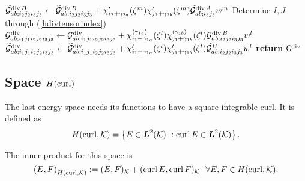 \begin{algorithm}[ht!]
\begin{algorithmic}
                                    \State$\widetilde{\mathcal{G}}_{ab;i_2j_2i_3j_3}^{\operatorname{div} B}\gets \widetilde{\mathcal{G}}_{ab;i_2j_2i_3j_3}^{\operatorname{div} B} + \chi_{i_2+\gamma_{2a}}'(\zeta^m) \chi_{j_2+\gamma_{2b}}'(\zeta^m) \widetilde{\mathcal{G}}_{ab;i_3j_3}^{\operatorname{div} A} w^m$
                                \EndIf
                        \EndFor       
                \EndFor
            \EndFor            
                            \State Determine $I,J$ through (\ref{hdivtensorindex})
                                            \State$\mathcal{G}_{ab;i_1j_1i_2j_2i_3j_3}^{\operatorname{div}}\gets \mathcal{G}_{ab;i_1j_1i_2j_2i_3j_3}^{\operatorname{div}} + \chi_{i_1+\gamma_{1a}}^{\langle\gamma_{1a}\rangle}(\zeta^l) \chi_{j_1+\gamma_{1b}}^{\langle\gamma_{1b}\rangle}(\zeta^l) \mathcal{G}_{ab;i_2j_2i_3j_3}^{\operatorname{div} B} w^l$ 
                                            \State$\widetilde{\mathcal{G}}_{ab;i_1j_1i_2j_2i_3j_3}^{\operatorname{div}}\gets \widetilde{\mathcal{G}}_{ab;i_1j_1i_2j_2i_3j_3}^{\operatorname{div}} + \chi_{i_1+\gamma_{1a}}'(\zeta^l) \chi_{j_1+\gamma_{1b}}'(\zeta^l) \widetilde{\mathcal{G}}_{ab;i_2j_2i_3j_3}^{B} w^l$
                                        \EndIf
                                \EndFor
                            \EndIf
                    \EndFor
            \EndFor
        \EndFor
    \EndFor
\EndFor
\State \textbf{return} $\mathsf{G}^{\operatorname{div}}$
\EndProcedure
\end{algorithmic}
\end{algorithm}
% 
%
\subsection{Space \texorpdfstring{$H(\operatorname{curl})$}{H(curl)}}
%
The last energy space needs its functions to have a square-integrable curl. It is defined as
%
\begin{equation}
    H(\operatorname{curl},\mathcal{K})=\left\{ E\in\boldsymbol{L}^2(\mathcal{K})\ :\operatorname{curl} E\in\boldsymbol{L}^2(\mathcal{K})\right\}.
\end{equation}

\noindent The inner product for this space is
%
\begin{equation}
    \left(E,F\right)_{H(\operatorname{curl},\mathcal{K})}:=(E,F)_{\mathcal{K}}+(\operatorname{curl} E,\operatorname{curl} F)_{\mathcal{K}}\ \ \forall E,F\in H(\operatorname{curl},\mathcal{K}).
\end{equation}

